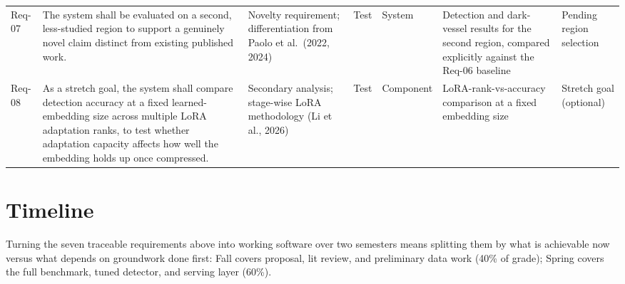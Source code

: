 \documentclass[11pt]{article}
\begin{document}
\begin{longtable}{@{}P{0.04\textwidth}P{0.235\textwidth}P{0.13\textwidth}P{0.135\textwidth}P{0.085\textwidth}P{0.195\textwidth}P{0.08\textwidth}@{}}
Req-07 & The system shall be evaluated on a second, less-studied region to support a genuinely novel claim distinct from existing published work. & Novelty requirement; differentiation from Paolo et al.\ (2022, 2024) & Test & System & Detection and dark-vessel results for the second region, compared explicitly against the Req-06 baseline & Pending region selection \\
Req-08 & As a stretch goal, the system shall compare detection accuracy at a fixed learned-embedding size across multiple LoRA adaptation ranks, to test whether adaptation capacity affects how well the embedding holds up once compressed. & Secondary analysis; stage-wise LoRA methodology (Li et al., 2026) & Test & Component & LoRA-rank-vs-accuracy comparison at a fixed embedding size & Stretch goal (optional) \\
\bottomrule
\end{longtable}

\section{Timeline}

Turning the seven traceable requirements above into working software over two semesters means splitting them by what is achievable now versus what depends on groundwork done first: Fall covers proposal, lit review, and preliminary data work (40\% of grade); Spring covers the full benchmark, tuned detector, and serving layer (60\%).
\end{document}
